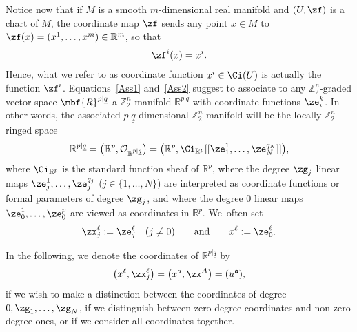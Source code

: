 \documentclass[pdftex]{sigma}%
\newcommand{\R}{{\mathbb R}}
\newcommand{\Z}{{\mathbb Z}}
\def\ul{\underline}
\def\cO{\mathcal{O}}
\def\ul{\underline}
\newcommand{\0}{\otimes}
\numberwithin{equation}{section}
\begin{document}
Notice now that if $M$ is a smooth $m$-dimensional real manifold and $(U,\zf)$ is a chart of $M$, the coordinate map $\zf$ sends any point $x\in M$ to $\zf(x)=(x^1,\dots,x^m)\in\R^m$, so that
\begin{gather}\label{Ass2}
\zf^i(x)=x^i.
\end{gather}
Hence, what we refer to as coordinate function $x^i\in\Ci(U)$ is actually the function $\zf^i$. Equations~\eqref{Ass1} and~\eqref{Ass2} suggest to associate to any $\Z_2^n$-graded vector space $\mbf{R}^{p|\ul q}$ a $\Z_2^n$-manifold $\R^{p|\ul q}$ with coordinate functions $\ze^k_i$. In other words, the associated $p|\ul q$-dimensional $\Z_2^n$-manifold will be the locally $\Z_2^n$-ringed space
\[
\R^{p|\ul q}=\big(\R^p,\cO_{\R^{p|\ul q}}\big)=\big(\R^p, \Ci_{\R^p}[[\ze_1^1,\dots,\ze_N^{q_N}]]\big),
\]
where $\Ci_{\R^p}$ is the standard function sheaf of $\R^p$, where the degree $\zg_j$ linear maps $\ze_j^1,\dots,\ze_j^{q_j}$ ($j\in\{1,\dots,N\}$) are interpreted as coordinate functions or formal parameters of degree $\zg_j$, and where the degree $0$ linear maps $\ze_0^1,\dots,\ze_0^{p}$ are viewed as coordinates in $\R^{p}$. We~often set
\begin{gather}\label{Equiv}
\zx^\ell_j:=\ze^\ell_j\quad (j\neq 0)\qquad\text{and}\qquad x^\ell := \ze^\ell_0.
\end{gather}

\begin{Remark}
In the following, we denote the coordinates of $\R^{p|\ul q}$ by
\[
\big(x^\ell,\zx_j^\ell\big)=\big(x^a,\zx^A\big)=(u^{\mathfrak{a}}),
\]
if we wish to make a distinction between the coordinates of degree $0,\zg_1,\dots,\zg_N$, if we distinguish between zero degree coordinates and non-zero degree ones, or if we consider all coordinates together.
\end{Remark}
\end{document}
